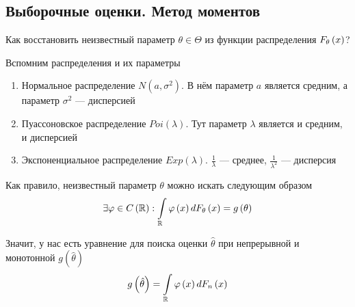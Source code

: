 \subsection{Выборочные оценки. Метод моментов}
Как восстановить неизвестный параметр $\theta\in\Theta$
из функции распределения $F_{\theta}\left(x\right)$?

Вспомним распределения и их параметры
\begin{enumerate}
  \item Нормальное распределение $N\left(a,\sigma^2\right)$.
    В нём параметр $a$ является средним,
    а параметр $\sigma^2$ --- дисперсией
  \item Пуассоновское распределение $Poi\left(\lambda\right)$.
    Тут параметр $\lambda$ является и средним, и дисперсией
  \item Экспоненциальное распределение $Exp\left(\lambda\right)$.
    $\frac{1}{\lambda}$ --- среднее,
    $\frac{1}{\lambda^2}$ --- дисперсия
\end{enumerate}

Как правило, неизвестный параметр $\theta$ можно искать следующим образом
$$\exists\varphi\in C\left(\mathbb{R}\right):
  \int\limits_{\mathbb{R}}\varphi\left(x\right)dF_{\theta}\left(x\right)
    =g\left(\theta\right)$$

Значит, у нас есть уравнение для поиска оценки $\hat{\theta}$
при непрерывной и монотонной $g\left( \hat{\theta} \right)$
\begin{align*}
g\left(\hat{\theta}\right)
  =\int\limits_{\mathbb{R}}\varphi\left(x\right)dF_n\left(x\right)
\end{align*}

